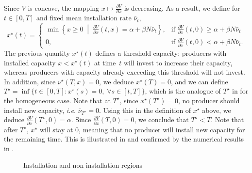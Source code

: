 \documentclass[12pt]{article}
\begin{document}
Since $V$ is concave, the mapping $x \longmapsto \frac{\partial V}{\partial x}$ is decreasing. As a result, we define for $t \in [0,T]$ and fixed mean installation rate $\bar{\nu}_t$,
\[
x^\star(t) =
\begin{cases}
\min \left\{ x \geq0 \;\middle|\; \frac{\partial V}{\partial x}(t, x) = \alpha + \beta N \bar{\nu}_t \right\}, & \text{if } \frac{\partial V}{\partial x}(t, 0) \geq \alpha + \beta N \bar{\nu}_t \\
0, & \text{if } \frac{\partial V}{\partial x}(t, 0) < \alpha + \beta N \bar{\nu}_t.
\end{cases}
\]
The previous quantity \(x^\star(t)\) defines a threshold capacity: producers with installed capacity \(x < x^\star(t)\) at time~\(t\) will invest to increase their capacity, whereas producers with capacity already exceeding this threshold will not invest. In addition, since $\nu^{\star}(T,x)=0$, we deduce $x^\star(T)=0$, and we can define $T^\star=\inf \{t \in [0,T] : x^\star(s)=0, \; \forall s \in [t,T] \}$,
which is the analogue of $T^\star$ in  for the homogeneous case. 
Note that at $T^\star$, since $x^\star(T^\star) = 0$, no producer should install new capacity, \textit{i.e.} $\bar{\nu}_{T^\star}=0$. Using this in the definition of $x^\star$ above, we deduce $\frac{\partial V}{\partial x} (T^{\star},0)=\alpha$. Since $\frac{\partial V}{\partial x} (T,0)=0$, we conclude that $T^\star < T$. Note that after $T^\star$, $x^\star$ will stay at $0$, meaning that no producer will install new capacity for the remaining time. This is illustrated in  and confirmed by the numerical results in .
 
\begin{figure}[ht]
\centering
{}
\caption{Installation and non-installation regions}
\label{x_star_fig}
\end{figure}
\end{document}

